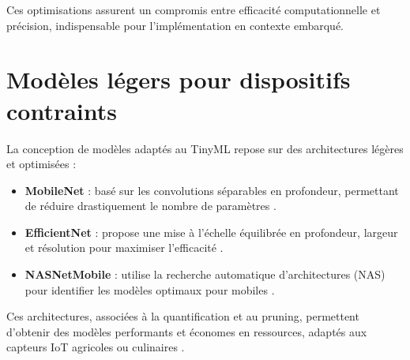 Ces optimisations assurent un compromis entre efficacité computationnelle et précision, indispensable pour l’implémentation en contexte embarqué.

\section{Modèles légers pour dispositifs contraints}
La conception de modèles adaptés au TinyML repose sur des architectures légères et optimisées :
\begin{itemize}
	\item \textbf{MobileNet} : basé sur les convolutions séparables en profondeur, permettant de réduire drastiquement le nombre de paramètres \cite{howard2017mobilenets}.
	\item \textbf{EfficientNet} : propose une mise à l’échelle équilibrée en profondeur, largeur et résolution pour maximiser l’efficacité \cite{tan2019mnasnet}.
	\item \textbf{NASNetMobile} : utilise la recherche automatique d’architectures (NAS) pour identifier les modèles optimaux pour mobiles \cite{zoph2018}.
\end{itemize}

Ces architectures, associées à la quantification et au pruning, permettent d’obtenir des modèles performants et économes en ressources, adaptés aux capteurs IoT agricoles ou culinaires \cite{moeketsi2025}.

